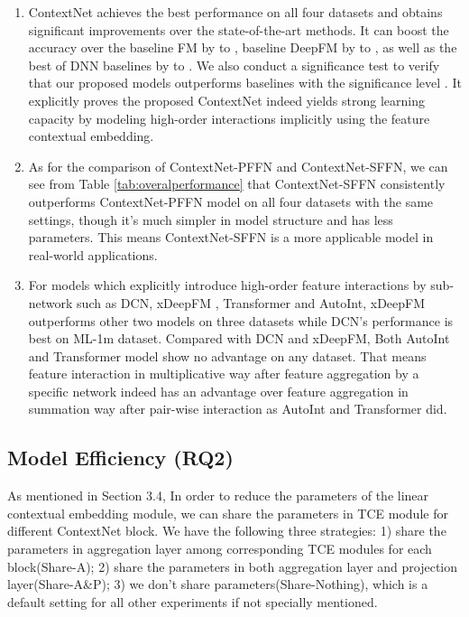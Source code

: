 \documentclass[sigconf]{acmart}
\begin{document}
\begin{enumerate}
  \item ContextNet achieves the best performance on all four datasets and obtains significant improvements over the state-of-the-art methods. It can boost the accuracy over the baseline FM by  to , baseline DeepFM by  to , as well as the best of DNN baselines by  to . We also conduct a significance test to verify that our proposed models outperforms baselines with the significance level . It explicitly proves the proposed ContextNet  indeed yields strong learning capacity by modeling high-order interactions implicitly using the feature contextual embedding.

  \item 	As for the comparison of ContextNet-PFFN and ContextNet-SFFN, we can see from Table \ref{tab:overalperformance} that ContextNet-SFFN consistently outperforms ContextNet-PFFN model on all four datasets with the same settings, though it's much simpler in model structure and has less parameters. This means ContextNet-SFFN is a more applicable model in real-world applications.


  \item For models which explicitly introduce high-order feature interactions by sub-network such as DCN, xDeepFM , Transformer and AutoInt, xDeepFM outperforms other two models on three datasets while DCN's performance is best on ML-1m dataset. Compared with DCN and xDeepFM, Both AutoInt and Transformer model show no advantage on any dataset. That means feature interaction in multiplicative way after feature aggregation by a specific network indeed has an advantage over feature aggregation in summation way after pair-wise interaction as AutoInt and Transformer did.
\end{enumerate}


\subsection{Model Efficiency (RQ2)}
As mentioned in Section 3.4, In order to reduce the parameters of the linear contextual embedding module, we can share the parameters in TCE module for different ContextNet block. We have the following three strategies: 1) share the parameters in aggregation layer among corresponding TCE modules for each block(Share-A); 2) share the parameters in both aggregation layer and projection layer(Share-A\&P); 3) we don't share parameters(Share-Nothing), which is a default setting for all other experiments if not specially mentioned.
\end{document}
